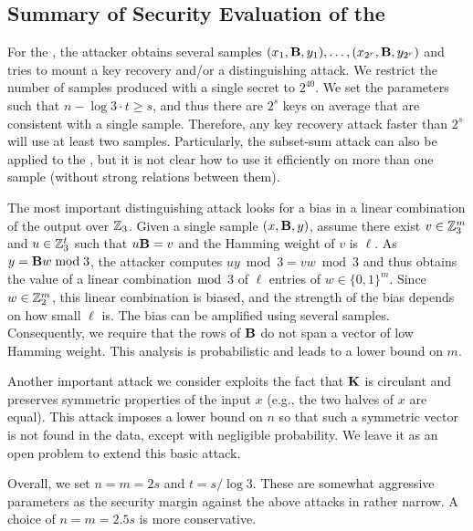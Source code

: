 \subsection{Summary of Security Evaluation of the \ttwPRF}
For the \ttwPRF, the attacker obtains several samples $(x_1,\mat{B},y_1) ,\ldots, (x_{2^r}, \mat{B},y_{2^r})$ and tries to mount a key recovery and/or a distinguishing attack. We restrict the number of samples produced with a single secret to $2^{40}$. We set the parameters such that $n - \log 3 \cdot t \geq s$, and thus there are $2^s$ keys on average that are consistent with a single sample. Therefore, any key recovery attack faster than $2^s$ will use at least two samples. Particularly, the subset-sum attack can also be applied to the \ttwPRF, but it is not clear how to use it efficiently on more than one sample (without strong relations between them).

The most important distinguishing attack looks for a bias in a linear combination of the output over $\mathbb{Z}_3$. Given a single sample $(x,\mat{B},y)$, assume there exist $v \in \mathbb{Z}_3^m$ and $u \in \mathbb{Z}_3^t$ such that $u \mat{B} = v$ and the Hamming weight of $v$ is $\ell$. As $y = \mat{B}w \bmod 3$, the attacker computes $uy \bmod 3 = vw \bmod 3$ and thus obtains the value of a linear combination $\bmod$ 3 of $\ell$ entries of $w \in \{0,1\}^m$. Since $w \in \mathbb{Z}_2^m$, this linear combination is biased, and the strength of the bias depends on how small $\ell$ is. The bias can be amplified using several samples. Consequently, we require that the rows of $\mat{B}$ do not span a vector of low Hamming weight. This analysis is probabilistic and leads to a lower bound on $m$.

Another important attack we consider exploits the fact that $\mat{K}$ is circulant and preserves symmetric properties of the input $x$ (e.g., the two halves of $x$ are equal). This attack imposes a lower bound on $n$ so that such a symmetric vector is not found in the data, except with negligible probability. We leave it as an open problem to extend this basic attack.

Overall, we set $n=m=2s$ and $t = s/\log 3$. These are somewhat aggressive parameters as the security margin against the above attacks in rather narrow. A choice of $n=m=2.5s$ is more conservative.


